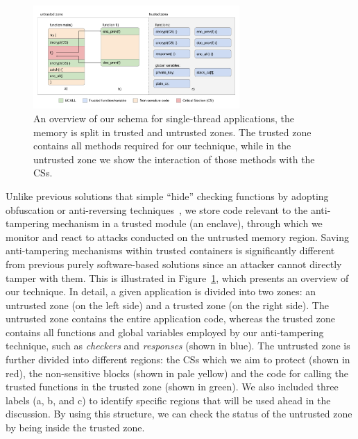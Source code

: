 \begin{figure}[t]
	\centering
	\includegraphics[width=0.7\textwidth]{fig_c3/core-all.pdf}
	\caption{An overview of our schema for single-thread applications, the 
	memory is split in trusted and untrusted zones. The trusted zone contains 
	all methods required for our technique, while in the untrusted zone we show 
	the interaction of those methods with the CSs.}
	\label{fig:core-all}
\end{figure}

Unlike previous solutions that simple ``hide'' checking functions by adopting
obfuscation or anti-reversing 
techniques~\cite{banescu2017tutorial,chang2001protecting,chen2016advanced,viticchie2016reactive},
 we store
code relevant to the anti-tampering mechanism in a trusted module (\ie an 
enclave),
through which we monitor and react to attacks conducted on
the untrusted memory region.
Saving anti-tampering mechanisms within trusted containers is significantly 
different from previous purely software-based solutions since an attacker 
cannot directly tamper with them.
This is illustrated in Figure~\ref{fig:core-all}, which presents an overview of 
our technique.
In detail, a given application is divided into two zones: an untrusted zone (on 
the left side) and a trusted zone (on the right side).
The untrusted zone contains the entire application code,
whereas the trusted zone contains all functions and global variables employed 
by our anti-tampering technique, such as \emph{checkers} and \emph{responses} 
(shown in blue).
The untrusted zone is further divided into different regions: the CSs which we 
aim to protect (shown in red), the non-sensitive blocks (shown in pale yellow) 
and the code for calling the trusted functions in the trusted zone (shown in 
green).
We also included three labels (\ie a, b, and c) to identify specific regions 
that will be used ahead in the discussion.
By using this structure, we can check the status of the untrusted zone by being 
inside the trusted zone.

